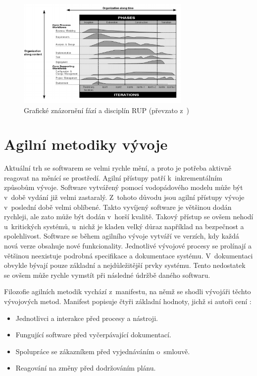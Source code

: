 \documentclass[czech,master]{diploma}
\begin{document}
\begin{figure}[!ht]
    \centering
    \includegraphics[width=0.75\textwidth]{Diplomka/Figures/rup.png}
    \caption{Grafické znázornění fází a disciplín RUP (převzato z~\cite{ref:rup_ibm})}
    \label{fig:rup}
\end{figure}

\section{Agilní metodiky vývoje}
Aktuální trh se softwarem se velmi rychle mění, a proto je potřeba aktivně reagovat na měnící se prostředí. Agilní přístupy patří k~inkrementálním způsobům vývoje. Software vytvářený pomocí vodopádového modelu může být v~době vydání již velmi zastaralý. Z~tohoto důvodu jsou agilní přístupy vývoje v~poslední době velmi oblíbené. Takto vyvíjený software je většinou dodán rychleji, ale zato může být dodán v~horší kvalitě. Takový přístup se ovšem nehodí u~kritických systémů, u~nichž je kladen velký důraz například na bezpečnost a spolehlivost. Software se během agilního vývoje vytváří ve verzích, kdy každá nová verze obsahuje nové funkcionality. Jednotlivé vývojové procesy se prolínají a většinou neexistuje podrobná specifikace a dokumentace systému. V~dokumentaci obvykle bývají pouze základní a nejdůležitější prvky systému. Tento nedostatek se ovšem může rychle vymstít při následné údržbě daného softwaru.

Filozofie agilních metodik vychází z~manifestu, na němž se shodli vývojáři těchto vývojových metod. Manifest popisuje čtyři základní hodnoty, jichž si autoři cení \cite{ref:agilne_manifesto}:

\begin{itemize}
\item Jednotlivci a interakce před procesy a nástroji.
\item Fungující software před vyčerpávající dokumentací.
\item Spolupráce se zákazníkem před vyjednáváním o~smlouvě.
\item Reagování na změny před dodržováním plánu.
\end{itemize}
\end{document}
